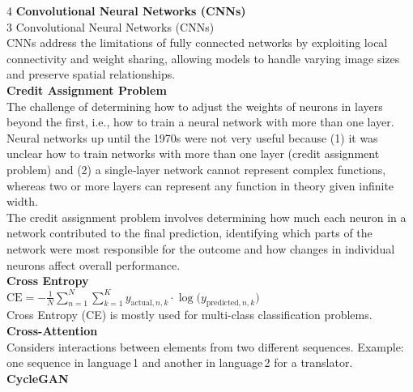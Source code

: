\documentclass[8pt]{extarticle}
\begin{document}
\begin{multicols}{4}
\vspace{2pt}\textbf{Convolutional Neural Networks (CNNs)}\\
3 Convolutional Neural Networks (CNNs)\\
CNNs address the limitations of fully connected networks by exploiting local connectivity and weight sharing, allowing models to handle varying image sizes and preserve spatial relationships.\\
\vspace{2pt}\textbf{Credit Assignment Problem}\\
The challenge of determining how to adjust the weights of neurons in layers beyond the first, i.e., how to train a neural network with more than one layer.\\
Neural networks up until the 1970s were not very useful because (1) it was unclear how to train networks with more than one layer (credit assignment problem) and (2) a single‑layer network cannot represent complex functions, whereas two or more layers can represent any function in theory given infinite width.\\
The credit assignment problem involves determining how much each neuron in a network contributed to the final prediction, identifying which parts of the network were most responsible for the outcome and how changes in individual neurons affect overall performance.\\
\vspace{2pt}\textbf{Cross Entropy}\\
$\text{CE} = -\frac{1}{N} \sum_{n=1}^{N} \sum_{k=1}^{K} y_{\text{actual},n,k} \cdot \log\bigl(y_{\text{predicted},n,k}\bigr)$\\
Cross Entropy (CE) is mostly used for multi-class classification problems.\\
\vspace{2pt}\textbf{Cross-Attention}\\
Considers interactions between elements from two different sequences. Example: one sequence in language 1 and another in language 2 for a translator.\\
\vspace{2pt}\textbf{CycleGAN}\\


\end{multicols}
\end{document}
